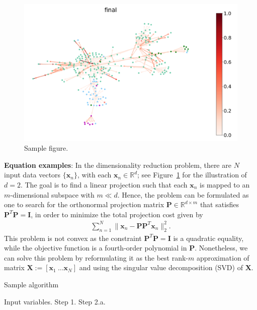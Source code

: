 \documentclass[11pt]{article}
\begin{document}
\begin{figure}[htb]\label{fig:ed}
	\centering
	\includegraphics[scale=0.1]{etc/proposal/figures/eg of visualize gat attention weights.png}
	\caption{Sample figure.}
\end{figure}

\textbf{Equation examples}: In the dimensionality reduction problem, there are $N$ input data vectors $\{\mathbf x_n\}$, with each $\mathbf x_n\in \mathbb R^d$; see Figure~\ref{fig:ed} for the illustration of $d=2$. The goal is to find a linear projection such that each $\mathbf x_n$ is mapped to an $m$-dimensional subspace with $m\ll d$. Hence, the problem can be formulated as one to search for the orthonormal projection matrix $\mathbf P \in \mathbb R^{d\times m}$ that satisfies $\mathbf P^T \mathbf P = \mathbf I$, in order to minimize the total projection cost given by 
\begin{align}\label{eq:pc}
\sum_{n=1}^N \| \mathbf x_n - \mathbf P \mathbf P^T \mathbf x_n\|_2^2.
\end{align}
This problem is not convex as the constraint $\mathbf P^T \mathbf P = \mathbf I$ is a quadratic equality, while the objective function is a fourth-order polynomial in $\mathbf P$. Nonetheless, we can solve this problem by reformulating it as the best rank-$m$ approximation of matrix $\mathbf X :=[\mathbf x_1~\ldots \mathbf x_N]$ and using the singular value decomposition (SVD) of $\mathbf X$. 

\begin{algorithm}[t]
	\caption{Sample algorithm} \label{alg:algorithm}
	\begin{algorithmic}[1]
		\REQUIRE Input variables.
		\STATE Step 1.
		\STATE Step 2.a.
		\ENDFOR
	\end{algorithmic}
\end{algorithm}
\end{document}

